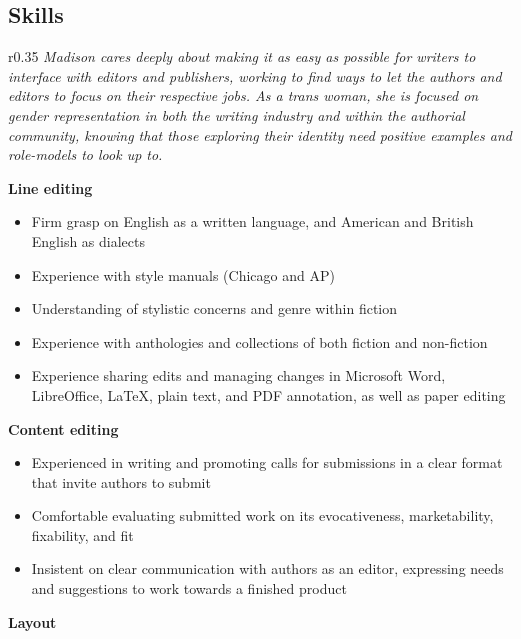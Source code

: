 \subsection{Skills}

\begin{wrapfigure}{r}{0.35\linewidth}
  \textit{\color{titlegreydark} \large Madison cares deeply about making it as easy as possible for writers to interface with editors and publishers, working to find ways to let the authors and editors to focus on their respective jobs. As a trans woman, she is focused on gender representation in both the writing industry and within the authorial community, knowing that those exploring their identity need positive examples and role-models to look up to.}
  \vspace{-1in}
\end{wrapfigure}

\textbf{Line editing}

\begin{itemize}
  \item Firm grasp on English as a written language, and American and British English as dialects
  \item Experience with style manuals (Chicago and AP)
  \item Understanding of stylistic concerns and genre within fiction
  \item Experience with anthologies and collections of both fiction and non-fiction
  \item Experience sharing edits and managing changes in Microsoft Word, LibreOffice, \LaTeX, plain text, and PDF annotation, as well as paper editing
\end{itemize}

\hspace{-1.5em}\textbf{Content editing}

\begin{itemize}
  \item Experienced in writing and promoting calls for submissions in a clear format that invite authors to submit
  \item Comfortable evaluating submitted work on its evocativeness, marketability, fixability, and fit
  \item Insistent on clear communication with authors as an editor, expressing needs and suggestions to work towards a finished product
\end{itemize}

\hspace{-1.5em}\textbf{Layout}

